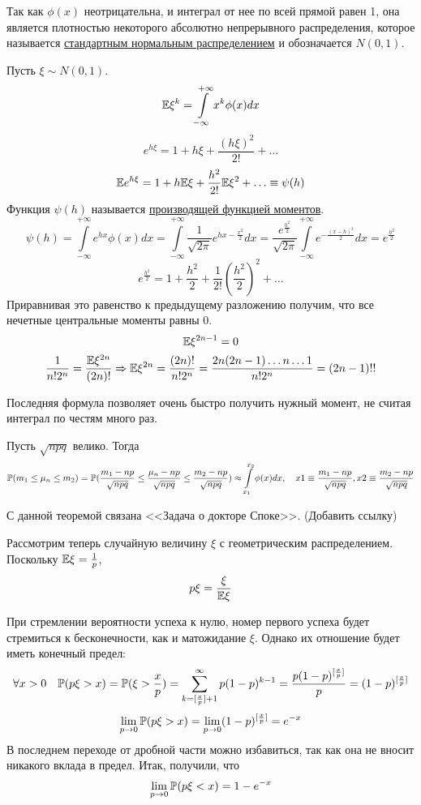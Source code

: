 \documentclass[../TV&MS.tex]{subfiles}
\begin{document}
Так как $\phi(x)$ неотрицательна, и интеграл от нее по всей прямой равен 1, она является плотностью некоторого абсолютно непрерывного распределения, которое называется \underline{стандартным нормальным распределением} и обозначается $N(0, 1)$.

Пусть $\xi \sim N(0,1)$.
$$\mathbb{E}\xi^k = \int\limits_{-\infty}^{+\infty}x^k\phi(x)dx$$
$$e^{h\xi}=1 + h\xi + \frac{(h\xi)^2}{2!} + \ldots$$
$$\mathbb{E} e^{h\xi} = 1 + h\mathbb{E}\xi + \frac{h^2}{2!}\mathbb{E}\xi^2 + \ldots \equiv \psi(h)$$
Функция $\psi(h)$ называется \underline{производящей функцией моментов}.
$$\psi(h) = \int\limits_{-\infty}^{+\infty}e^{hx}\phi(x)dx = \int\limits_{-\infty}^{+\infty}\frac{1}{\sqrt{2\pi}}e^{hx-\frac{x^2}2}dx = \frac{e^{\frac{h^2}2}}{\sqrt{2\pi}}\int\limits_{-\infty}^{+\infty}e^{-\frac{(x-h)^2}2}dx = e^{\frac{h^2}2}$$
$$e^{\frac{h^2}2} = 1 + \frac{h^2}2 + \frac1{2!}(\frac{h^2}2)^2 + \ldots$$
Приравнивая это равенство к предыдущему разложению получим, что все нечетные центральные моменты равны 0.
$$\mathbb{E}\xi^{2n-1} = 0$$
$$\frac{1}{n!2^n} = \frac{\mathbb{E}\xi^{2n}}{(2n)!} \Rightarrow \mathbb{E}\xi^{2n} = \frac{(2n)!}{n!2^n} = \frac{2n(2n-1)\ldots n \ldots 1}{n!2^n} = (2n-1)!!$$

Последняя формула позволяет очень быстро получить нужный момент, не считая интеграл по честям много раз.

\begin{Th}
Пусть $\sqrt{npq}$ велико. Тогда
$$\mathbb{P}(m_1 \le \mu_n \le m_2) = \mathbb{P}(\frac{m_1 - np}{\sqrt{npq}} \le \frac{\mu_n - np}{\sqrt{npq}} \le \frac{m_2 - np}{\sqrt{npq}}) \approx \int\limits_{x_1}^{x_2}\phi(x)dx, \quad x1 \equiv \frac{m_1 - np}{\sqrt{npq}}, x2 \equiv\frac{m_2 - np}{\sqrt{npq}}$$
\end{Th}

С данной теоремой связана <<Задача о докторе Споке>>. (Добавить ссылку)

Рассмотрим теперь случайную величину $\xi$ с геометрическим распределением. Поскольку $\mathbb{E}\xi = \frac1p$, 
$$p\xi=\frac{\xi}{\mathbb{E}\xi}$$

При стремлении вероятности успеха к нулю, номер первого успеха будет стремиться к бесконечности, как и матожидание $\xi$. Однако их отношение будет иметь конечный предел:
$$\forall x > 0 \quad \mathbb{P}(p\xi > x) = \mathbb{P}(\xi > \frac{x}p) = \sum\limits_{k = [\frac{x}{p}] + 1}^{\infty}p(1-p)^{k-1} = \frac{p(1-p)^{[\frac{x}p]}}p = (1-p)^{[\frac{x}p]}$$ 
$$\lim\limits_{p \to 0} \mathbb{P}(p\xi > x) = \lim\limits_{p \to 0}(1-p)^{[\frac{x}p]} = e^{-x}$$
В последнем переходе от дробной части можно избавиться, так как она не вносит никакого вклада в предел.
Итак, получили, что
$$\lim\limits_{p \to 0} \mathbb{P}(p\xi < x) = 1 - e^{-x}$$
\end{document}
